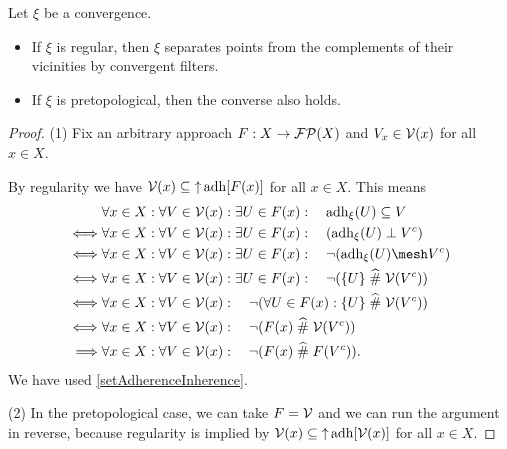 \begin{proposition} \label{regularityBySeparation}
Let $\xi$ be a convergence.
\begin{itemize}
\item If $\xi$ is regular, then $\xi$ separates points from the complements of their vicinities by convergent filters.
\item If $\xi$ is pretopological, then the converse also holds.
\end{itemize}
\end{proposition}
\begin{proof}
(1) Fix an arbitrary approach $F: X\to \operatorname{\mathcal{FP}}(X)$ and $V_x\in \operatorname{\mathcal{V}}(x)$ for all $x\in X$.

By regularity we have $\operatorname{\mathcal{V}}(x)\subseteq \operatorname{\uparrow}\operatorname{adh}[F(x)]$ for all $x\in X$.
This means
\begin{align*}
& \forall x\in X: \forall V\in \vicinities(x): \exists U \in F(x): \quad \adh_\xi(U) \subseteq V \\
\iff& \forall x\in X: \forall V\in \vicinities(x): \exists U \in F(x): \quad (\adh_\xi(U) \perp V^c) \\
\iff& \forall x\in X: \forall V\in \vicinities(x): \exists U \in F(x): \quad \neg(\adh_\xi(U) \mesh V^c) \\
\iff& \forall x\in X: \forall V\in \vicinities(x): \exists U \in F(x): \quad \neg(\{U\} \amesh \vicinities(V^c)) \\
\iff& \forall x\in X: \forall V\in \vicinities(x): \quad \neg(\forall U \in F(x):\{U\} \amesh \vicinities(V^c)) \\
\iff& \forall x\in X: \forall V\in \vicinities(x): \quad \neg(F(x) \amesh \vicinities(V^c)) \\
\implies& \forall x\in X: \forall V\in \vicinities(x): \quad \neg(F(x) \amesh F(V^c)).
\end{align*}
We have used \ref{setAdherenceInherence}.

(2) In the pretopological case, we can take $F = \operatorname{\mathcal{V}}$ and we can run the argument in reverse, because regularity is implied by $\operatorname{\mathcal{V}}(x)\subseteq \operatorname{\uparrow}\operatorname{adh}[\operatorname{\mathcal{V}}(x)]$ for all $x\in X$.
\end{proof}

